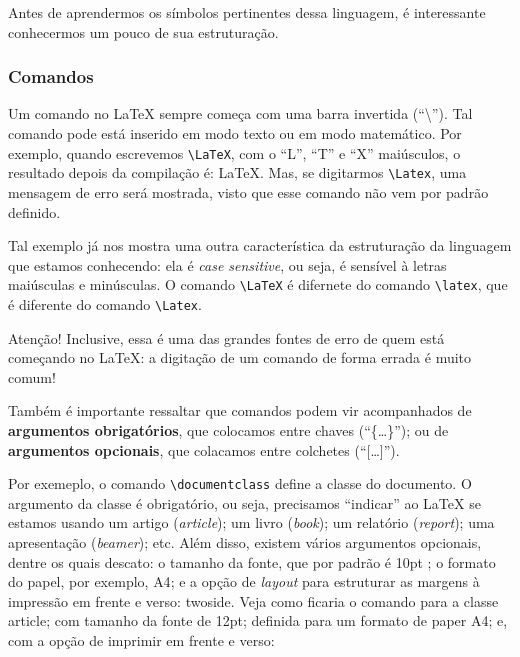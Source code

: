 Antes de aprendermos os símbolos pertinentes dessa linguagem, é interessante 
conhecermos um pouco de sua estruturação.
% 
  \subsubsection{Comandos}
% 
Um comando no \LaTeX{} sempre começa com uma barra invertida (``\textbackslash'').
Tal comando pode está inserido em \textsf{modo texto} ou em \textsf{modo matemático}.
Por exemplo, quando escrevemos \verb|\LaTeX|, com o ``L'', ``T'' e ``X'' maiúsculos, 
o resultado depois da compilação é: \LaTeX.
Mas, se digitarmos \verb|\Latex|, uma mensagem de erro será mostrada, visto que 
esse comando não vem por padrão definido.

Tal exemplo já nos mostra uma outra característica da estruturação da linguagem 
que estamos conhecendo: ela é \textit{case sensitive}, ou seja, é sensível à
letras maiúsculas e minúsculas.
O comando \verb|\LaTeX| é difernete do comando \verb|\latex|, que é diferente do
comando \verb|\Latex|.

\begin{atencao}{Atenção!}{\exclamacao}
  Inclusive, essa é uma das grandes fontes de erro de quem está começando no 
  \LaTeX: a digitação de um comando de forma errada é muito comum!
\end{atencao}

Também é importante ressaltar que comandos podem vir acompanhados de 
\textbf{\textsf{argumentos obrigatórios}}, que colocamos entre \textsf{chaves} 
(``\textsf{\{\ldots\}}''); ou de \textbf{\textsf{argumentos opcionais}}, que colacamos 
entre \textsf{colchetes} (``\textsf{[\ldots]}'').

Por exemeplo, o comando \verb|\documentclass| define a \textsf{classe} do 
documento.
O argumento da classe é obrigatório, ou seja, precisamos ``indicar'' ao \LaTeX{}
se estamos usando um \textsf{artigo} (\textit{article}); um \textsf{livro} 
(\textit{book}); um relatório (\textit{report}); uma apresentação (\textit{beamer});
etc.
Além disso, existem vários argumentos opcionais, dentre os quais descato: o 
tamanho da fonte, que por padrão é \textsf{10pt}
; o formato do papel, por exemplo, \textsf{A4}; e a opção de \textit{layout} para
estruturar as margens à impressão em frente e verso: \textsf{twoside}.
Veja como ficaria o comando para a classe \textsf{article}; com tamanho da fonte 
de \textsf{12pt}; definida para um formato de paper \textsf{A4}; e, com a opção 
de imprimir em frente e verso:

